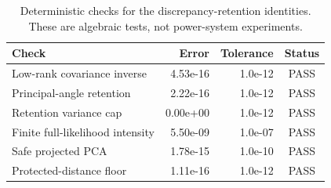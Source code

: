 \begin{table}[t]
\caption{Deterministic checks for the discrepancy-retention identities. These are algebraic tests, not power-system experiments.}
\label{tab:supp-discrepancy-design-checks}
\centering
\scriptsize
\begin{tabular}{@{}lrrc@{}}
\toprule
Check & Error & Tolerance & Status \\
\midrule
Low-rank covariance inverse & 4.53e-16 & 1.0e-12 & PASS \\
Principal-angle retention & 2.22e-16 & 1.0e-12 & PASS \\
Retention variance cap & 0.00e+00 & 1.0e-12 & PASS \\
Finite full-likelihood intensity & 5.50e-09 & 1.0e-07 & PASS \\
Safe projected PCA & 1.78e-15 & 1.0e-10 & PASS \\
Protected-distance floor & 1.11e-16 & 1.0e-12 & PASS \\
\bottomrule
\end{tabular}
\end{table}
